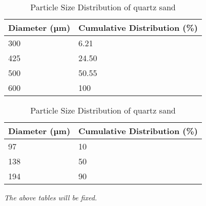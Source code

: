 

\begin{table}[H]
    \begin{tabular}{l|l}
        Diameter (µm) & Cumulative Distribution (\%) \\ \hline
        300                    & 6.21                         \\
        425                    & 24.50                          \\
        500                    & 50.55                        \\
        600                    & 100                         
    \end{tabular}
    \begin{tabular}{l|l}
        Diameter (µm) & Cumulative Distribution (\%) \\ \hline
        97                    & 10                         \\
        138                    & 50                          \\
        194                    & 90                        
    \end{tabular}
    \caption{Particle Size Distribution of Eskal 150}\label{table:PSDlimestone} 
    \caption{Particle Size Distribution of quartz sand}\label{table:PSDQuartzSand}

\end{table}

\textit{The above tables will be fixed.}



